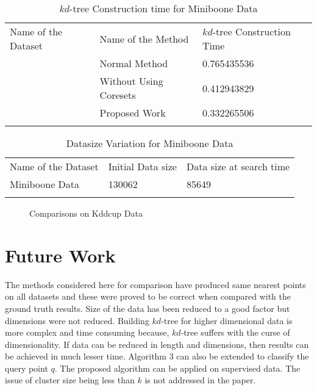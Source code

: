 \documentclass[runningheads]{llncs}
\begin{document}
\begin{table}[!hbt]
	\caption{$kd$-tree Construction time for Miniboone Data}
	\label{tab:20}       %
	\begin{tabular}{p{3cm}p{4cm}p{3.4cm}}
		\hline\noalign{\smallskip}
		Name of the Dataset & Name of the Method & $kd$-tree Construction Time  \\
		\noalign{\smallskip}\hline\noalign{\smallskip}
		\multirow{3}{*}{Miniboone Data} & Normal Method  & 0.765435536\\
		& Without Using Coresets & 0.412943829\\
		& Proposed Work  & 0.332265506\\
		\noalign{\smallskip}\hline\noalign{\smallskip}
	\end{tabular}
\end{table}
\begin{table}[!hbt]
	\caption{Datasize Variation for Miniboone Data}
	\label{tab:22}       %
	\begin{tabular}{p{3cm}p{4cm}p{3.4cm}}
		\hline\noalign{\smallskip}
		Name of the Dataset & Initial Data size & Data size at search time  \\
		\noalign{\smallskip}\hline\noalign{\smallskip}
		Miniboone Data& 130062  & 85649 \\
		\noalign{\smallskip}\hline\noalign{\smallskip}
	\end{tabular}
\end{table}

\begin{figure}[!hbt]
	\hspace{0mm}
	\hspace{0mm}
	\caption{Comparisons on Kddcup Data }
	\label{fig:8}     
\end{figure}

\section{Future Work}
\label{sec:5}
The methods considered here for comparison have produced same nearest points on all datasets and these were proved to be correct when compared with the ground truth results. Size of the data has been reduced to a good factor but dimensions were not reduced. Building $kd$-tree for higher dimensional data is more complex and time consuming because, $kd$-tree suffers with the curse of dimensionality. If data can be reduced in length and dimensions, then results can be achieved in much lesser time. Algorithm 3 can also be extended to classify the query point $q$. The proposed algorithm can be applied on supervised data. The issue of cluster size being less than $k$ is not addressed in the paper. 
\end{document}
